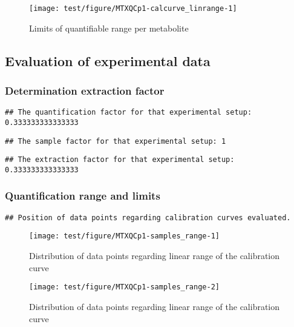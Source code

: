 \documentclass[9pt,]{article}
\begin{document}
\begin{figure}

{\centering \texttt{[image: test/figure/MTXQCp1-calcurve\_linrange-1]} 

}

\caption{Limits of quantifiable range per metabolite}\label{fig:calcurve_linrange}
\end{figure}

\subsection{Evaluation of experimental
data}\label{evaluation-of-experimental-data}

\subsubsection{Determination extraction
factor}\label{determination-extraction-factor}

\begin{verbatim}
## The quantification factor for that experimental setup: 0.333333333333333
\end{verbatim}

\begin{verbatim}
## The sample factor for that experimental setup: 1
\end{verbatim}

\begin{verbatim}
## The extraction factor for that experimental setup: 0.333333333333333
\end{verbatim}

\subsubsection{Quantification range and
limits}\label{quantification-range-and-limits}

\begin{verbatim}
## Position of data points regarding calibration curves evaluated.
\end{verbatim}

\begin{figure}

{\centering \texttt{[image: test/figure/MTXQCp1-samples\_range-1]} 

}

\caption{Distribution of data points regarding linear range of the calibration curve}\label{fig:samples_range1}
\end{figure}\begin{figure}

{\centering \texttt{[image: test/figure/MTXQCp1-samples\_range-2]} 

}

\caption{Distribution of data points regarding linear range of the calibration curve}\label{fig:samples_range2}
\end{figure}
\end{document}
